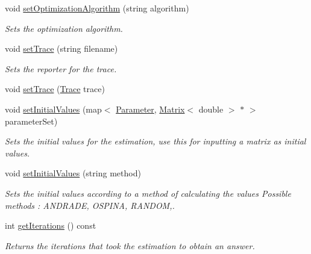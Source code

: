 \begin{DoxyCompactItemize}
void \hyperlink{classEMEstimation_aa599b89650be2a1f95c1a986af5755f2}{set\+Optimization\+Algorithm} (string algorithm)
\begin{DoxyCompactList}\small\item\em Sets the optimization algorithm. \end{DoxyCompactList}\item 
void \hyperlink{classEMEstimation_ae8d8d6a4f2874d0da59ae2f57f21750a}{set\+Trace} (string filename)
\begin{DoxyCompactList}\small\item\em Sets the reporter for the trace. \end{DoxyCompactList}\item 
void \hyperlink{classEMEstimation_aadb720a89ed634dff963c4d50970b249}{set\+Trace} (\hyperlink{classTrace}{Trace} trace)
\item 
void \hyperlink{classEMEstimation_a1f773c655ba098b5d6c8269de00003c3}{set\+Initial\+Values} (map$<$ \hyperlink{ParameterModel_8h_a04ed5b8f1f3adf7af1d5092fae847e90}{Parameter}, \hyperlink{singletonMatrix}{Matrix}$<$ double $>$ $\ast$ $>$ parameter\+Set)
\begin{DoxyCompactList}\small\item\em Sets the initial values for the estimation, use this for inputting a matrix as initial values. \end{DoxyCompactList}\item 
void \hyperlink{classEMEstimation_a9e6a83bfa5f78ec1531f67538dc12f93}{set\+Initial\+Values} (string method)
\begin{DoxyCompactList}\small\item\em Sets the initial values according to a method of calculating the values Possible methods \+: A\+N\+D\+R\+A\+D\+E, O\+S\+P\+I\+N\+A, R\+A\+N\+D\+O\+M,. \end{DoxyCompactList}\item 
int \hyperlink{classEMEstimation_a939385baead6848507efd5949906f50b}{get\+Iterations} () const 
\begin{DoxyCompactList}\small\item\em Returns the iterations that took the estimation to obtain an answer. \end{DoxyCompactList}\end{DoxyCompactItemize}
